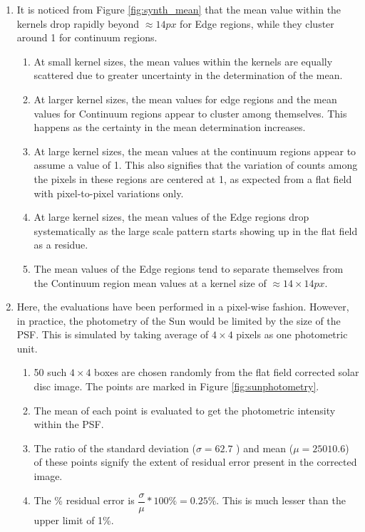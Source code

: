 \documentclass[11pt,a4paper]{article}
\begin{document}
\begin{enumerate}
		\item \label{point:Mean}It is noticed from Figure \ref{fig:synth_mean} that the mean value within the kernels drop rapidly beyond $\approx 14 px$ for Edge regions, while they cluster around 1 for continuum regions.
		\begin{enumerate}
			\item At small kernel sizes, the mean values within the kernels are equally scattered due to greater uncertainty in the determination of the mean.
			\item At larger kernel sizes, the mean values for edge regions and the mean values for Continuum regions appear to cluster among themselves. This happens as the certainty in the mean determination increases.
			\item At large kernel sizes, the mean values at the continuum regions appear to assume a value of 1. This also signifies that the variation of counts among the pixels in these regions are centered at 1, as expected from a flat field with pixel-to-pixel variations only.
			\item At large kernel sizes, the mean values of the Edge regions drop systematically as the large scale pattern starts showing up in the flat field as a residue.
			\item The mean values of the Edge regions tend to separate themselves from the Continuum region mean values at a kernel size of $\approx 14\times14 px$.
		\end{enumerate}
	
	\item Here, the evaluations have been performed in a pixel-wise fashion. However, in practice, the photometry of the Sun would be limited by the size of the PSF. This is simulated by taking average of $4 \times 4$ pixels as one photometric unit.
	\begin{enumerate}
		\item 50 such $4\times4$ boxes are chosen randomly from the flat field corrected solar disc image. The points are marked in Figure \ref{fig:sunphotometry}.
		\item The mean of each point is evaluated to get the photometric intensity within the PSF.
		\item The ratio of the standard deviation ($\sigma= 62.7$ ) and mean ($\mu= 25010.6$) of these points signify the extent of residual error present in the corrected image.
		\item The \% residual error is $\dfrac{\sigma}{\mu}*100\%= 0.25\%$. This is much lesser than the upper limit of 1\%.
	\end{enumerate}
	\end{enumerate}
	
\end{document}
